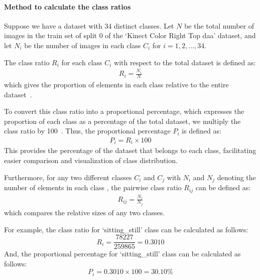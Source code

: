\paragraph{Method to calculate the class ratios}
Suppose we have a dataset with 34 distinct classes. Let \( N \) be the total number of images in the train set of split 0 of the `Kinect Color Right Top \gls{daa}' dataset, and let \( N_i \) be the number of images in each class \( C_i \) for \( i = 1, 2, \ldots, 34 \).

The class ratio \( R_i \) for each class \( C_i \) with respect to the total dataset is defined as:
\begin{equation}
\begin{aligned}
R_i = \frac{N_i}{N}
\end{aligned}
\label{equation:4.1}
\end{equation}
which gives the proportion of elements in each class relative to the entire dataset~\citep{Survey_DL_Taghi_article, 23_ImR_buda2018systematic}.

To convert this class ratio into a proportional percentage, which expresses the proportion of each class as a percentage of the total dataset, we multiply the class ratio by 100~\citep{book_stat_ratios_bennett2003statistical}. Thus, the proportional percentage \( P_i \) is defined as:
\begin{equation}
\begin{aligned}
P_i = R_i \times 100
\end{aligned}
\label{equation:4.2}
\end{equation}
This provides the percentage of the dataset that belongs to each class, facilitating easier comparison and visualization of class distribution.

Furthermore, for any two different classes \( C_i \) and \( C_j \) with \( N_i \) and \( N_j \) denoting the number of elements in each class , the pairwise class ratio \( R_{ij} \) can be defined as:
\begin{equation}
\begin{aligned}
R_{ij} = \frac{N_i}{N_j}
\end{aligned}
\label{equation:4.3}
\end{equation}
which compares the relative sizes of any two classes.

For example, the class ratio for `sitting\_still' class can be calculated as follows:
\[
R_i = \frac{78227}{259865} = 0.3010
\]
And, the proportional percentage for `sitting\_still' class can be calculated as follows:
\[
P_i = 0.3010 \times 100 = 30.10\%
\]

